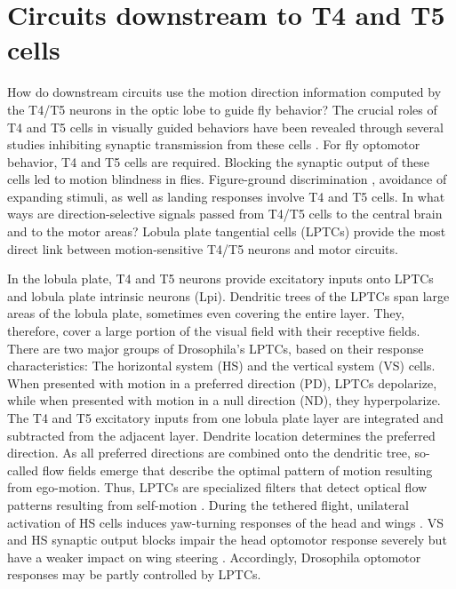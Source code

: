 \section{Circuits downstream to T4 and T5 cells}
How do downstream circuits use the motion direction information computed by the T4/T5 neurons in the optic lobe to guide fly behavior? The crucial roles of T4 and T5 cells in visually guided behaviors have been revealed through several studies inhibiting synaptic transmission from these cells \parencite{Bahl2013}. For fly optomotor behavior, T4 and T5 cells are required. Blocking the synaptic output of these cells led to motion blindness in flies. Figure-ground discrimination \parencite{Fenk2014}, avoidance of expanding stimuli, as well as landing responses \parencite{Schilling2015} involve T4 and T5 cells. In what ways are direction-selective signals passed from T4/T5 cells to the central brain and to the motor areas? Lobula plate tangential cells (LPTCs) provide the most direct link between motion-sensitive T4/T5 neurons and motor circuits. 

In the lobula plate, T4 and T5 neurons provide excitatory inputs onto LPTCs and lobula plate intrinsic neurons (Lpi). Dendritic trees of the LPTCs span large areas of the lobula plate, sometimes even covering the entire layer. They, therefore, cover a large portion of the visual field with their receptive fields. There are two major groups of Drosophila's LPTCs, based on their response characteristics: The horizontal system (HS) and the vertical system (VS) cells. When presented with motion in a preferred direction (PD), LPTCs depolarize, while when presented with motion in a null direction (ND), they hyperpolarize. The T4 and T5 excitatory inputs from one lobula plate layer are integrated and subtracted from the adjacent layer. Dendrite location determines the preferred direction. As all preferred directions are combined onto the dendritic tree, so-called flow fields emerge that describe the optimal pattern of motion resulting from ego-motion. Thus, LPTCs are specialized filters that detect optical flow patterns resulting from self-motion \parencite{Krapp1996}. During the tethered flight, unilateral activation of HS cells induces yaw-turning responses of the head and wings \parencite{Haikala2013}. VS and HS synaptic output blocks impair the head optomotor response severely but have a weaker impact on wing steering \parencite{Kim2017}. Accordingly, Drosophila optomotor responses may be partly controlled by LPTCs.


